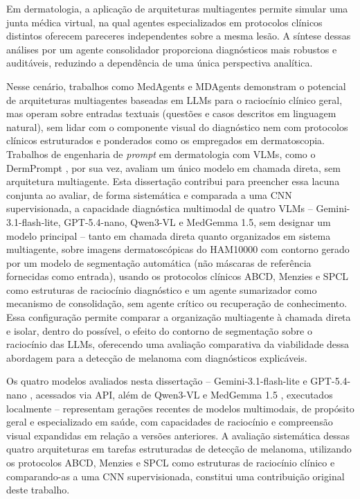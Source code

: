 Em dermatologia, a aplicação de arquiteturas multiagentes permite simular uma junta médica virtual, na qual agentes especializados em protocolos clínicos distintos oferecem pareceres independentes sobre a mesma lesão. A síntese dessas análises por um agente consolidador proporciona diagnósticos mais robustos e auditáveis, reduzindo a dependência de uma única perspectiva analítica.

Nesse cenário, trabalhos como MedAgents \cite{tang2024medagents} e MDAgents \cite{kim2024mdagents} demonstram o potencial de arquiteturas multiagentes baseadas em LLMs para o raciocínio clínico geral, mas operam sobre entradas textuais (questões e casos descritos em linguagem natural), sem lidar com o componente visual do diagnóstico nem com protocolos clínicos estruturados e ponderados como os empregados em dermatoscopia. Trabalhos de engenharia de \textit{prompt} em dermatologia com VLMs, como o DermPrompt \cite{vashisht2024umassbionlpmediqam3g2024dermprompt}, por sua vez, avaliam um único modelo em chamada direta, sem arquitetura multiagente. Esta dissertação contribui para preencher essa lacuna conjunta ao avaliar, de forma sistemática e comparada a uma CNN supervisionada, a capacidade diagnóstica multimodal de quatro VLMs -- Gemini-3.1-flash-lite, GPT-5.4-nano, Qwen3-VL e MedGemma 1.5, sem designar um modelo principal -- tanto em chamada direta quanto organizados em sistema multiagente, sobre imagens dermatoscópicas do HAM10000 com contorno gerado por um modelo de segmentação automática (não máscaras de referência fornecidas como entrada), usando os protocolos clínicos ABCD, Menzies e SPCL como estruturas de raciocínio diagnóstico e um agente sumarizador como mecanismo de consolidação, sem agente crítico ou recuperação de conhecimento. Essa configuração permite comparar a organização multiagente à chamada direta e isolar, dentro do possível, o efeito do contorno de segmentação sobre o raciocínio das LLMs, oferecendo uma avaliação comparativa da viabilidade dessa abordagem para a detecção de melanoma com diagnósticos explicáveis.

Os quatro modelos avaliados nesta dissertação -- Gemini-3.1-flash-lite \cite{google2025gemini31} e GPT-5.4-nano \cite{openai2025gpt5nano}, acessados via API, além de Qwen3-VL \cite{qwen2025qwen3vl} e MedGemma 1.5 \cite{google2025medgemma}, executados localmente -- representam gerações recentes de modelos multimodais, de propósito geral e especializado em saúde, com capacidades de raciocínio e compreensão visual expandidas em relação a versões anteriores. A avaliação sistemática dessas quatro arquiteturas em tarefas estruturadas de detecção de melanoma, utilizando os protocolos ABCD, Menzies e SPCL como estruturas de raciocínio clínico e comparando-as a uma CNN supervisionada, constitui uma contribuição original deste trabalho.
